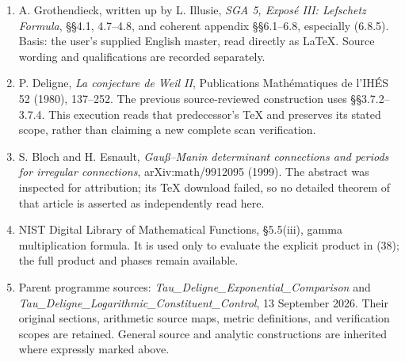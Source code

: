 \documentclass[
  11pt,
]{article}
\providecommand{\tightlist}{%
  \setlength{\itemsep}{0pt}\setlength{\parskip}{0pt}}
\begin{document}
\begin{enumerate}
\def\labelenumi{\arabic{enumi}.}
\tightlist
\item
  A. Grothendieck, written up by L. Illusie, \emph{SGA 5, Exposé III:
  Lefschetz Formula}, §§4.1, 4.7--4.8, and coherent appendix §§6.1--6.8,
  especially (6.8.5). Basis: the user's supplied English master, read
  directly as LaTeX. Source wording and qualifications are recorded
  separately.
\item
  P. Deligne, \emph{La conjecture de Weil II}, Publications
  Mathématiques de l'IHÉS 52 (1980), 137--252. The previous
  source-reviewed construction uses §§3.7.2--3.7.4. This execution reads
  that predecessor's TeX and preserves its stated scope, rather than
  claiming a new complete scan verification.
\item
  S. Bloch and H. Esnault, \emph{Gauß--Manin determinant connections and
  periods for irregular connections}, arXiv:math/9912095 (1999). The
  abstract was inspected for attribution; its TeX download failed, so no
  detailed theorem of that article is asserted as independently read
  here.
\item
  NIST Digital Library of Mathematical Functions, §5.5(iii), gamma
  multiplication formula. It is used only to evaluate the explicit
  product in (38); the full product and phases remain available.
\item
  Parent programme sources: \emph{Tau\_Deligne\_Exponential\_Comparison}
  and \emph{Tau\_Deligne\_Logarithmic\_Constituent\_Control}, 13
  September 2026. Their original sections, arithmetic source maps,
  metric definitions, and verification scopes are retained. General
  source and analytic constructions are inherited where expressly marked
  above.
\end{enumerate}
\end{document}
